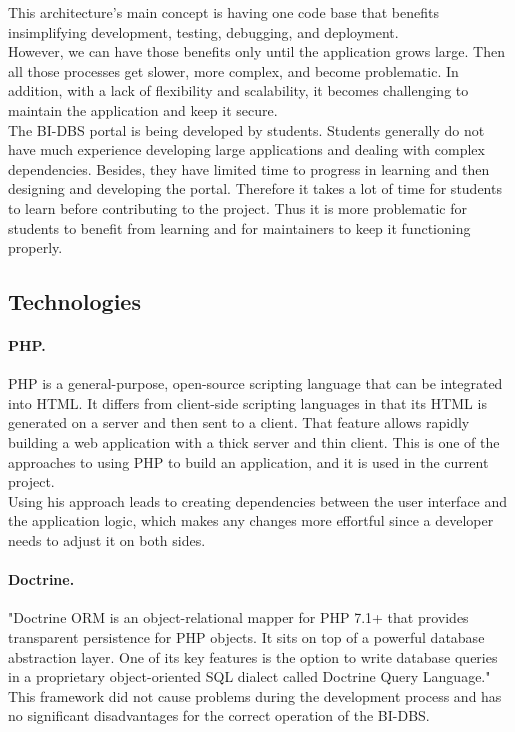 \noindent This architecture's main concept is having one code base that benefits in\newline simplifying development, testing, debugging, and deployment.\\
However, we can have those benefits only until the application grows large. Then all those processes get slower, more complex, and become problematic. In addition, with a lack of flexibility and scalability, it becomes challenging to maintain the application and keep it secure.\\

\noindent The BI-DBS portal is being developed by students. Students generally do not have much experience developing large applications and dealing with complex dependencies. Besides, they have limited time to progress in learning and then designing and developing the portal. Therefore it takes a lot of time for students to learn before contributing to the project. Thus it is more problematic for students to benefit from learning and for maintainers to keep it functioning properly.




\subsection{Technologies}
\paragraph*{PHP.} PHP is a general-purpose, open-source scripting language that can be integrated into HTML.\cite{php-doc}\cite{html-doc} It differs from client-side scripting languages in that its HTML is generated on a server and then sent to a client. That feature allows rapidly building a web application with a thick server and thin client. This is one of the approaches to using PHP to build an application, and it is used in the current project. \\
Using his approach leads to creating dependencies between the user interface and the application logic, which makes any changes more effortful since a developer needs to adjust it on both sides.

\paragraph*{Doctrine.} "Doctrine ORM is an object-relational mapper for PHP 7.1+ that provides transparent persistence for PHP objects. It sits on top of a powerful database abstraction layer. One of its key features is the option to write database queries in a proprietary object-oriented SQL dialect called Doctrine Query Language."\cite{doctrine-doc}\\ 
This framework did not cause problems during the development process and has no significant disadvantages for the correct operation of the BI-DBS.

